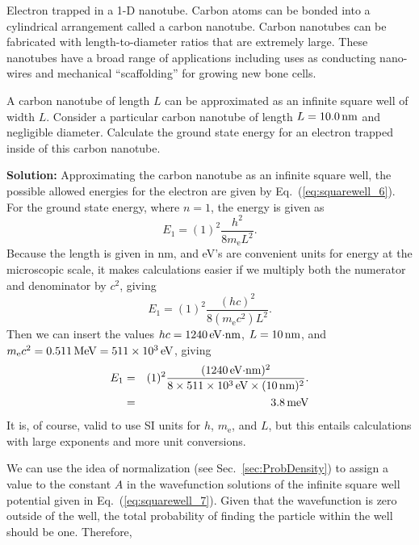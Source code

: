 \begin{example}{Electron trapped in a 1-D nanotube.}
\label{exam:nanoTube}
Carbon atoms can be bonded into a cylindrical arrangement called a
carbon nanotube.  Carbon nanotubes can be fabricated with
length-to-diameter ratios that are extremely large. These nanotubes
have a broad range of applications including uses as conducting nano-wires
and mechanical ``scaffolding'' for growing new bone cells.

A carbon nanotube of length $L$ can be approximated as an infinite 
square well of width $L$.  Consider a particular carbon nanotube 
of length $L = 10.0\,\mbox{nm}$ and negligible diameter.  Calculate 
the ground state energy for an electron trapped inside of this carbon nanotube.

{\bf Solution:} Approximating the carbon nanotube as an infinite
square well, the possible allowed energies for the electron are 
given by Eq.~(\ref{eq:squarewell_6}).  For the ground state
energy, where $n = 1$, the energy is given as
\begin{equation}
E_1 = (1)^2 \frac{h^2}{8 m_\text{e} L^2}. 
\end{equation}
Because the length is given in nm, and eV's are convenient units 
for energy at the microscopic scale, it makes calculations easier 
if we multiply both the numerator and denominator by $c^2$, 
giving 
\begin{equation}
E_1 = (1)^2 \frac{(hc)^2}{8 (m_\text{e}c^2) L^2}. 
\end{equation}
Then we can insert the values $hc = 1240\,\mbox{eV$\cdot$nm}$, 
$L = 10\,\mbox{nm}$, and $m_\text{e}c^2 = 0.511\,\mbox{MeV} 
= 511\times 10^3\,\mbox{eV}$, giving
\begin{eqnarray}
E_1 &=& (1)^2 \frac{(1240\,\mbox{eV$\cdot$nm})^2}
    {8\times 511\times 10^3\,\mbox{eV}\times (10\,\mbox{nm})^2  }. \nonumber \\
    &=& 3.8\,\mbox{meV} 
\end{eqnarray} 
It is, of course, valid to use SI units for $h$, $m_\text{e}$, and $L$, but 
this entails calculations with large exponents and more unit conversions.
\end{example}


We can use the idea of normalization (see Sec.~\ref{sec:ProbDensity}) to
assign a value to the constant $A$ in the wavefunction solutions of
the infinite square well potential given in 
Eq.~(\ref{eq:squarewell_7}). Given that the wavefunction is zero outside
of the well, the total probability of finding the particle within the
well should be one.  Therefore,


